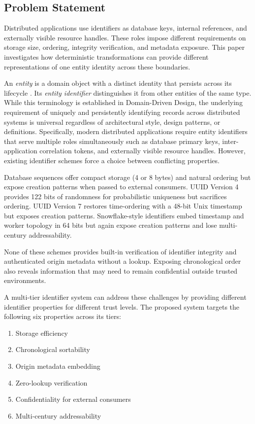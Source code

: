 \documentclass[a4paper,fleqn]{cas-sc}
\providecommand{\tightlist}{%
  \setlength{\itemsep}{0pt}\setlength{\parskip}{0pt}}
\begin{document}
\subsection{Problem Statement}\label{problem-statement}

Distributed applications use identifiers as database keys, internal
references, and externally visible resource handles. These roles impose
different requirements on storage size, ordering, integrity
verification, and metadata exposure. This paper investigates how
deterministic transformations can provide different representations of
one entity identity across these boundaries.

An \emph{entity} is a domain object with a distinct identity that
persists across its lifecycle \citep{evans2003}. Its \emph{entity
identifier} distinguishes it from other entities of the same type. While
this terminology is established in Domain-Driven Design, the underlying
requirement of uniquely and persistently identifying records across
distributed systems is universal regardless of architectural style,
design patterns, or definitions. Specifically, modern distributed
applications require entity identifiers that serve multiple roles
simultaneously such as database primary keys, inter-application
correlation tokens, and externally visible resource handles. However,
existing identifier schemes force a choice between conflicting
properties.

Database sequences offer compact storage (4 or 8 bytes) and natural
ordering but expose creation patterns when passed to external consumers.
UUID Version 4 \citep{rfc9562} provides 122 bits of randomness for
probabilistic uniqueness but sacrifices ordering. UUID Version 7
\citep{rfc9562} restores time-ordering with a 48-bit Unix timestamp but
exposes creation patterns. Snowflake-style identifiers \citep{snowflake}
embed timestamp and worker topology in 64 bits but again expose creation
patterns and lose multi-century addressability.

None of these schemes provides built-in verification of identifier
integrity and authenticated origin metadata without a lookup. Exposing
chronological order also reveals information that may need to remain
confidential outside trusted environments.

A multi-tier identifier system can address these challenges by providing
different identifier properties for different trust levels. The proposed
system targets the following six properties across its tiers:

\begin{enumerate}
\def\labelenumi{\arabic{enumi}.}
\tightlist
\item
  Storage efficiency
\item
  Chronological sortability
\item
  Origin metadata embedding
\item
  Zero-lookup verification
\item
  Confidentiality for external consumers
\item
  Multi-century addressability
\end{enumerate}
\end{document}
